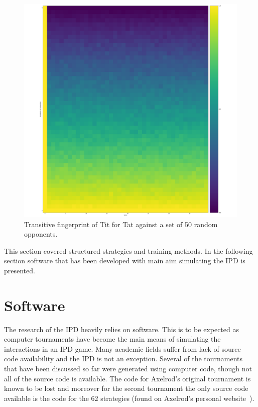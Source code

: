 \begin{figure}[!hbtp]
    \centering
    \includegraphics[height=.3\textheight]{src/chapters/chapters-02/Tit_for_Tat_fingerprint.png}
    \caption{Transitive fingerprint of Tit for Tat against a set of 50 random opponents.}
    \label{fig:transitive_fingerprinting}
\end{figure}

This section covered structured strategies and training methods. In the following
section software that has been developed with main aim simulating the IPD
is presented.

\section{Software}\label{section:software}

The research of the IPD heavily relies on software.
This is to be expected as computer tournaments have become the main
means of simulating the interactions in an IPD game.
Many academic fields suffer from lack of source code availability and the IPD
is not an exception. Several of the tournaments that have been discussed so far were generated
using computer code, though not all of the source code is available.
The code for Axelrod's original tournament is known to be lost and
moreover for the second tournament the only source code available is the code
for the 62 strategies (found on Axelrod's personal website~\cite{fortan_code}).


